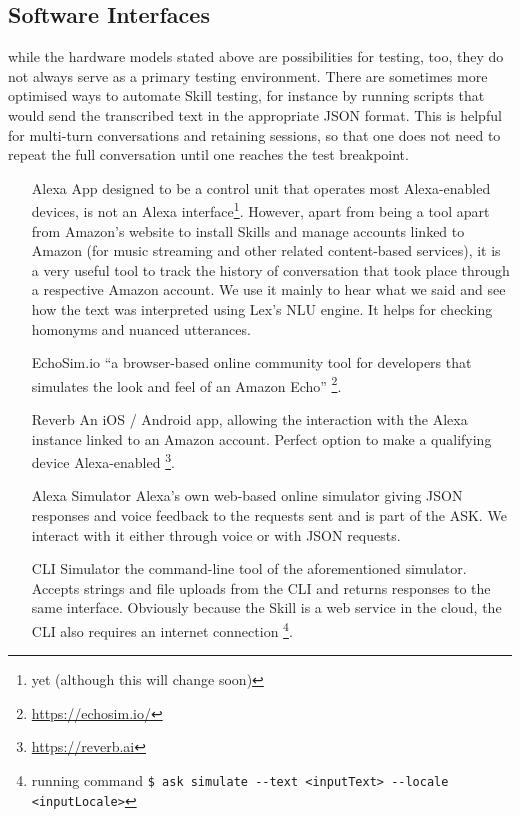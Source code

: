 



\subsection*{Software Interfaces}



while the hardware models stated above are possibilities for testing, too, they do not always serve as a primary testing environment. There are sometimes more optimised ways to automate Skill testing, for instance by running scripts that would send the transcribed text in the appropriate JSON format. This is helpful for multi-turn conversations and retaining sessions, so that one does not need to repeat the full conversation until one reaches the test breakpoint.

\begin{itemize}
	
	\item[Alexa App] designed to be a control unit that operates most Alexa-enabled devices, is not an Alexa interface\footnote{yet (although this will change soon)}. However, apart from being a tool apart from Amazon's website to install Skills and manage accounts linked to Amazon (for music streaming and other related content-based services), it is a very useful tool to track the history of conversation that took place through a respective Amazon account. We use it mainly to hear what we said and see how the text was interpreted using Lex's NLU engine. It helps for checking homonyms and nuanced utterances.
	
	
	\item[EchoSim.io] ``a browser-based online community tool for developers that simulates the look and feel of an Amazon Echo'' \footnote{\url{https://echosim.io/}}. %
	
	\item[Reverb] An iOS / Android app, allowing the interaction with the Alexa instance linked to an Amazon account. Perfect option to make a qualifying device Alexa-enabled \footnote{\url{https://reverb.ai}}. 
	
	\item[Alexa Simulator] Alexa's own web-based online simulator giving JSON responses and voice feedback to the requests sent and is part of the ASK. We interact with it either through voice or with JSON requests. 
	
	\item[CLI Simulator] the command-line tool of the aforementioned simulator. Accepts strings and file uploads from the CLI and returns responses to the same interface. Obviously because the Skill is a web service in the cloud, the CLI also requires an internet connection \footnote{running command \lstinline|$ ask simulate --text <inputText> --locale <inputLocale>|}.
	
\end{itemize}



